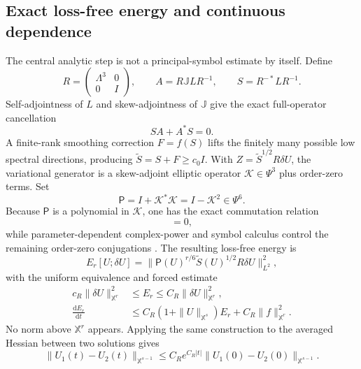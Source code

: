 \documentclass[aps,prd,reprint,onecolumn,notitlepage,nofootinbib,longbibliography,floatfix]{revtex4-2}
\theoremstyle{scstyle}
\theoremstyle{definition}
\theoremstyle{remark}
\newcommand{\dd}{\mathrm{d}}
\begin{document}
\subsection{Exact loss-free energy and continuous dependence}
The central analytic step is not a principal-symbol estimate by itself.  Define
\begin{equation}
 R=\begin{pmatrix}\Lambda^3&0\\0&I\end{pmatrix},\qquad
 A=R\mathbb JLR^{-1},\qquad
 S=R^{-*}LR^{-1}.
 \label{eq:compAS}
\end{equation}
Self-adjointness of $L$ and skew-adjointness of $\mathbb J$ give the exact full-operator cancellation
\begin{equation}
 SA+A^*S=0.
 \label{eq:compExactSymm}
\end{equation}
A finite-rank smoothing correction $F=f(S)$ lifts the finitely many possible low spectral directions, producing $\widetilde S=S+F\ge c_0I$.  With $Z=\widetilde S^{1/2}R\delta U$, the variational generator is a skew-adjoint elliptic operator $\mathscr K\in\Psi^3$ plus order-zero terms.  Set
\begin{equation}
 \mathsf P=I+\mathscr K^*\mathscr K=I-\mathscr K^2\in\Psi^6.
 \label{eq:compP}
\end{equation}
Because $\mathsf P$ is a polynomial in $\mathscr K$, one has the exact commutation relation
\begin{equation}
 [\mathsf P^{r/6},\mathscr K]=0,
 \label{eq:compCommute}
\end{equation}
while parameter-dependent complex-power and symbol calculus control the remaining order-zero conjugations \cite{Seeley,Taylor}.  The resulting loss-free energy is
\begin{equation}
 E_r[U;\delta U]=
 \|\mathsf P(U)^{r/6}\widetilde S(U)^{1/2}R\delta U\|_{L^2}^2,
 \label{eq:compEnergy}
\end{equation}
with the uniform equivalence and forced estimate
\begin{align}
 c_R\|\delta U\|_{\mathbb X^r}^2&\le E_r\le
 C_R\|\delta U\|_{\mathbb X^r}^2,\nonumber\\
 \frac{\dd E_r}{\dd t}&\le
 C_R(1+\|U\|_{\mathbb X^s})E_r+C_R\|f\|_{\mathbb X^r}^2.
 \label{eq:compLossFree}
\end{align}
No norm above $\mathbb X^r$ appears.  Applying the same construction to the averaged Hessian between two solutions gives
\begin{equation}
 \|U_1(t)-U_2(t)\|_{\mathbb X^{s-1}}
 \le C_Re^{C_R|t|}\|U_1(0)-U_2(0)\|_{\mathbb X^{s-1}}.
 \label{eq:compDifference}
\end{equation}
\end{document}
